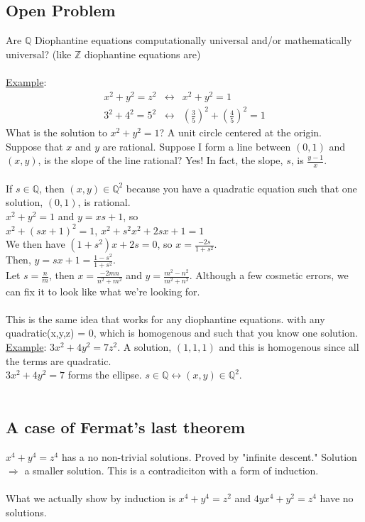   \subsection*{Open Problem}
    Are $\mathbb{Q}$ Diophantine equations computationally universal and/or
    mathematically universal? (like $\mathbb{Z}$ diophantine equations are)\\\\
    \underline{Example}: 
    \begin{eqnarray*}
      x^2 + y^2 = z^2  &\leftrightarrow& x^2 + y^2 = 1\\
      3^2 + 4^2 = 5^2  &\leftrightarrow& \left(\frac{3}{5}\right)^2 + \left(
        \frac{4}{5}\right)^2 = 1
    \end{eqnarray*}
    What is the solution to $x^2 + y^2 = 1$? A unit circle centered at the
    origin.\\
    Suppose that $x$ and $y$ are rational. Suppose I form a line between 
    $(0,1)$ and $(x,y)$, is the slope of the line rational? Yes! In fact,
    the slope, $s$, is $\frac{y-1}{x}$.\\\\
    If $s \in \mathbb{Q}$, then $(x,y) \in \mathbb{Q}^2$ because you have
    a quadratic equation such that one solution, $(0,1)$, is rational.\\
    $x^2 + y^2 = 1$ and $y = xs + 1$, so \\
    $x^2 + (sx + 1)^2 = 1$, $x^2 + s^2x^2 + 2sx + 1 = 1$\\
    We then have $(1 + s^2)x + 2s = 0$, so $x = \frac{-2s}{1+s^2}$.\\
    Then, $y = sx + 1 = \frac{1 - s^2}{1 + s^2}$.\\
    Let $s = \frac{n}{m}$, then $x = \frac{-2mn}{n^2 + m^2}$ and $y = \frac{
    m^2 - n^2}{m^2 + n^2}$. Although a few cosmetic errors, we can fix it
    to look like what we're looking for.\\\\
    This is the same idea that works for any diophantine equations. with any 
    quadratic(x,y,z) = 0, which is homogenous and such that you know one 
    solution.\\
    \underline{Example}: $3x^2 + 4y^2 = 7z^2$. A solution, $(1,1,1)$ and
    this is homogenous since all the terms are quadratic.\\
    $3x^2 + 4y^2 = 7$ forms the ellipse. $s \in \mathbb{Q} \leftrightarrow
    (x,y) \in \mathbb{Q}^2$.\\\\
  \subsection*{A case of Fermat's last theorem}
    $x^4 + y^4 = z^4$ has a no non-trivial solutions. Proved by 
    "infinite descent." Solution $\Rightarrow$ a smaller solution. This is
    a contradiciton with a form of induction.\\\\
    What we actually show by induction is $x^4 + y^4 = z^2$ and $4yx^4 +
    y^2 = z^4$ have no solutions.\\
